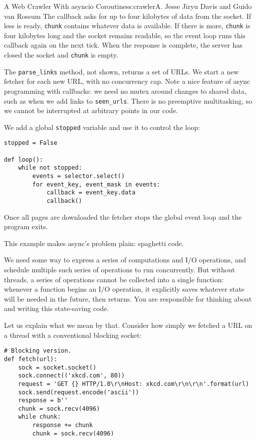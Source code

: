 \begin{aosachapter}{A Web Crawler With asyncio Coroutines}{s:crawler}{A. Jesse Jiryu Davis and Guido van Rossum}
The callback asks for up to four kilobytes of data from the socket. If
less is ready, \texttt{chunk} contains whatever data is available. If
there is more, \texttt{chunk} is four kilobytes long and the socket
remains readable, so the event loop runs this callback again on the next
tick. When the response is complete, the server has closed the socket
and \texttt{chunk} is empty.

The \texttt{parse\_links} method, not shown, returns a set of URLs. We
start a new fetcher for each new URL, with no concurrency cap. Note a
nice feature of async programming with callbacks: we need no mutex
around changes to shared data, such as when we add links to
\texttt{seen\_urls}. There is no preemptive multitasking, so we cannot
be interrupted at arbitrary points in our code.

We add a global \texttt{stopped} variable and use it to control the
loop:

\begin{verbatim}
stopped = False

def loop():
    while not stopped:
        events = selector.select()
        for event_key, event_mask in events:
            callback = event_key.data
            callback()
\end{verbatim}

Once all pages are downloaded the fetcher stops the global event loop
and the program exits.

This example makes async's problem plain: spaghetti code.

We need some way to express a series of computations and I/O operations,
and schedule multiple such series of operations to run concurrently. But
without threads, a series of operations cannot be collected into a
single function: whenever a function begins an I/O operation, it
explicitly saves whatever state will be needed in the future, then
returns. You are responsible for thinking about and writing this
state-saving code.

Let us explain what we mean by that. Consider how simply we fetched a
URL on a thread with a conventional blocking socket:

\begin{verbatim}
# Blocking version.
def fetch(url):
    sock = socket.socket()
    sock.connect(('xkcd.com', 80))
    request = 'GET {} HTTP/1.0\r\nHost: xkcd.com\r\n\r\n'.format(url)
    sock.send(request.encode('ascii'))
    response = b''
    chunk = sock.recv(4096)
    while chunk:
        response += chunk
        chunk = sock.recv(4096)
    

\end{verbatim}
\end{aosachapter}
